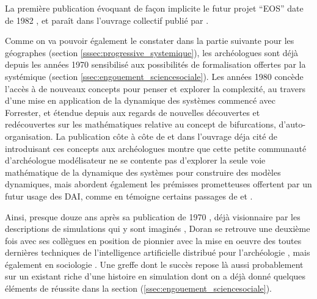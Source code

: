 La première publication évoquant de façon implicite le futur projet \foreignquote{english}{EOS} date de 1982 \autocite{Doran1982}, et paraît dans l'ouvrage collectif publié par \textcite{Renfrew1982}.


Comme on va pouvoir également le constater dans la partie suivante pour les géographes (section \ref{sssec:progressive_systemique}), les archéologues sont déjà depuis les années 1970 sensibilisé aux possibilités de formalisation offertes par la systémique (section \ref{ssec:engouement_sciencesociale}). Les années 1980 concède l'accès à de nouveaux concepts pour penser et explorer la complexité, au travers d'une mise en application de la dynamique des systèmes commencé avec Forrester, et étendue depuis aux regards de nouvelles découvertes et redécouvertes sur les mathématiques relative au concept de bifurcations, d'auto-organisation. La publication côte à côte de \textcite{Doran1982} et \textcite{Allen1982} dans l'ouvrage déja cité de \textcite{Renfrew1982} introduisant ces concepts aux archéologues montre que cette petite communauté d'archéologue modélisateur ne se contente pas d'explorer la seule voie mathématique de la dynamique des systèmes pour construire des modèles dynamiques, mais abordent également les prémisses prometteuses  offertent par un futur usage des DAI, comme en témoigne certains passages de \textcite{Doran1982}  et \textcite{Doran1986b} .

Ainsi, presque douze ans après sa publication de 1970 \autocite{Doran1970}, déjà visionnaire par les descriptions de simulations qui y sont imaginés , Doran se retrouve une deuxième fois avec ses collègues en position de pionnier avec la mise en oeuvre des toutes dernières techniques de l'intelligence artificielle distribué pour l'archéologie , mais également en sociologie \autocite{Doran1985}. Une greffe dont le succès repose là aussi probablement sur un existant riche d'une histoire en simulation dont on a déjà donné quelques éléments de réussite dans la section (\ref{ssec:engouement_sciencesociale}).


